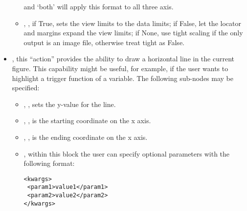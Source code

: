 \begin{itemize}
\begin{itemize}
    and `both' will apply this format to all three axis.
    \item {}, , if True, sets the view
    limits to the data limits; if False, let the locator and margins expand the
    view limits; if None, use tight scaling if the only output is an image file,
    otherwise treat tight as False.
  \end{itemize}
  \item {}, this ``action'' provides the ability to draw
  a horizontal line in the current figure.
  This capability might be useful, for example, if the user wants to highlight a
  trigger function of a variable.
  The following sub-nodes may be specified:
  \begin{itemize}
    \item {}, , sets the y-value for the
    line.
    \item {}, , is the starting
    coordinate on the x axis.
    \item {}, , is the ending coordinate
    on the x axis.
    \item {}, within this block the user can specify optional
    parameters with the following format:

\begin{lstlisting}[style=XML]
<kwargs>
 <param1>value1</param1>
 <param2>value2</param2>
</kwargs>
\end{lstlisting}


\end{itemize}
\end{itemize}
